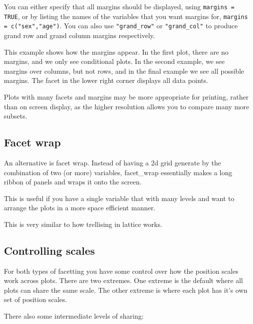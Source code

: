 You can either specify that all margins should be displayed, using {\tt margins = TRUE}, or by listing the names of the variables that you want margins for, {\tt margins = c("sex","age")}.  You can also use \verb|"grand_row"| or \verb|"grand_col"| to produce grand row and grand column margins respectively.

This example shows how the margins appear.  In the first plot, there are no margins, and we only see conditional plots.  In the second example, we see margins over columns, but not rows, and in the final example we see all possible margins.  The facet in the lower right corner displays all data points.

\begin{alltt}

\end{alltt}

Plots with many facets and margins may be more appropriate for printing, rather than on screen display, as the higher resolution allows you to compare many more subsets.

\subsection{Facet wrap}
\label{sub:facet_wrap}

An alternative is facet wrap.  Instead of having a 2d grid generate by the combination of two (or more) variables, facet\_wrap essentially makes a long ribbon of panels and wraps it onto the screen.  

This is useful if you have a single variable that with many levels and want to arrange the plots in a more space efficient manner.

This is very similar to how trellising in lattice works.

\subsection{Controlling scales}
\label{sub:controlling_scales}

For both types of facetting you have some control over how the position scales work across plots.  There are two extremes.  One extreme is the default where all plots can share the same scale.  The other extreme is where each plot has it's own set of position scales.  

There also some intermediate levels of sharing:

